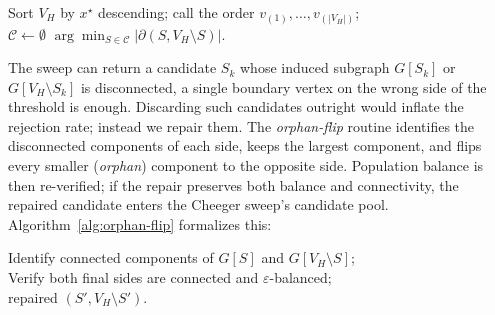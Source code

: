\documentclass[11pt]{article}
\begin{document}
\begin{algorithm}[H]
\caption{Cheeger-sweep rounding with orphan-flip repair}\label{alg:cheeger-sweep}
Sort $V_H$ by $x^\star$ descending; call the order $v_{(1)}, \ldots, v_{(|V_H|)}$;\\
$\mathcal{C} \gets \emptyset$ 
\Return $\arg\min_{S \in \mathcal{C}} |\partial(S, V_H \setminus S)|$.
\end{algorithm}

The sweep can return a candidate $S_k$ whose induced subgraph $G[S_k]$
or $G[V_H \setminus S_k]$ is disconnected, a single boundary vertex
on the wrong side of the threshold is enough. Discarding such
candidates outright would inflate the rejection rate; instead we repair
them. The \emph{orphan-flip} routine identifies the disconnected
components of each side, keeps the largest component, and flips every
smaller (\emph{orphan}) component to the opposite side. Population
balance is then re-verified; if the repair preserves both balance and
connectivity, the repaired candidate enters the Cheeger sweep's
candidate pool. Algorithm~\ref{alg:orphan-flip} formalizes this:

\begin{algorithm}[H]
\caption{Orphan-flip repair}\label{alg:orphan-flip}
Identify connected components of $G[S]$ and $G[V_H \setminus S]$;\\
Verify both final sides are connected and $\varepsilon$-balanced;\\
\Return repaired $(S', V_H \setminus S')$.
\end{algorithm}
\end{document}
